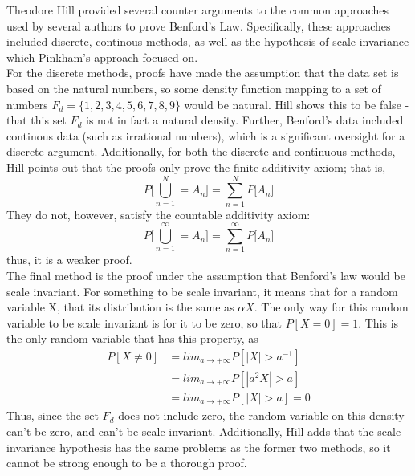 \documentclass[12pt, titlepage]{article}
\begin{document}
Theodore Hill \cite{hill} provided several counter arguments to the common approaches used by several authors to prove Benford's Law. Specifically, these approaches included discrete, continous methods, as well as the hypothesis of scale-invariance which Pinkham's approach focused on. \\
For the discrete methods, proofs have made the assumption that the data set is based on the natural numbers, so some density function mapping to a set of numbers $F_d = \{1, 2, 3, 4, 5, 6, 7, 8, 9\}$ would be natural. Hill shows this to be false - that this set $F_d$ is not in fact a natural density. Further, Benford's data included continous data (such as irrational numbers), which is a significant oversight for a discrete argument. Additionally, for both the discrete and continuous methods, Hill points out that the proofs only prove the finite additivity axiom; that is,
\begin{equation*}
	P\big[\bigcup^N_{n=1}=A_n\big]=\sum^N_{n=1}P\big[A_n\big]
\end{equation*}
They do not, however, satisfy the countable additivity axiom:
\begin{equation*}
	P\big[\bigcup^\infty_{n=1}=A_n\big]=\sum^\infty_{n=1}P\big[A_n\big]
\end{equation*}
thus, it is a weaker proof.\\
The final method is the proof under the assumption that Benford's law would be scale invariant. For something to be scale invariant, it means that for a random variable X, that its distribution is the same as $\alpha X$. The only way for this random variable to be scale invariant is for it to be zero, so that $P[X = 0] = 1$. This is the only random variable that has this property, as \cite{hill_book}
\begin{equation}
	\begin{split}
		P[X \neq 0] & = lim_{a \rightarrow +\infty}P[|X| > a^{-1}] \\
		& = lim_{a \rightarrow +\infty}P[|a^2X| > a] \\
		& = lim_{a \rightarrow +\infty}P[|X| > a] = 0
	\end{split}
\end{equation}
 Thus, since the set $F_d$ does not include zero, the random variable on this density can't be zero, and can't be scale invariant. Additionally, Hill adds that the scale invariance hypothesis has the same problems as the former two methods, so it cannot be strong enough to be a thorough proof.
\pagebreak
\end{document}
